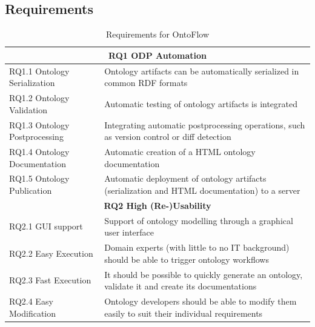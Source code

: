 \documentclass[runningheads]{llncs}
\begin{document}
\subsection{Requirements}

\begin{table}[hbt]
	\caption{Requirements for OntoFlow}
	\renewcommand{\arraystretch}{1.3}
	\begin{tabular}{p{} p{}}
		\hline
		\multicolumn{2}{c}{\textbf{RQ1 ODP Automation}}                                                                                  \\
		\hline\hline
		RQ1.1 Ontology Serialization  & Ontology artifacts can be automatically serialized in common RDF formats                         \\

		RQ1.2 Ontology Validation     & Automatic testing of ontology artifacts is integrated                                            \\

		RQ1.3 Ontology Postprocessing & Integrating automatic postprocessing operations, such as version control or diff detection       \\

		RQ1.4 Ontology  Documentation & Automatic creation of a HTML ontology documentation                                              \\

		RQ1.5 Ontology Publication    & Automatic deployment of ontology artifacts (serialization and HTML documentation) to a server    \\
		\hline
		\multicolumn{2}{c}{\textbf{RQ2 High (Re-)Usability}}                                                                             \\
		\hline
		\hline
		RQ2.1 GUI support             & Support of ontology modelling through a graphical user interface                                 \\

		RQ2.2 Easy Execution          & Domain experts (with little to no IT background) should be able to trigger ontology workflows    \\

		RQ2.3 Fast Execution          & It should be possible to quickly generate an ontology, validate it and create its documentations \\

		RQ2.4 Easy Modification       & Ontology developers should be able to modify them easily to suit their individual requirements   \\
		\hline
	\end{tabular}\label{tab:req}
\end{table}
\end{document}
